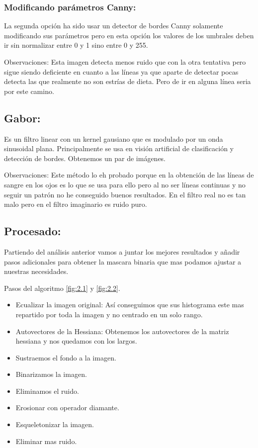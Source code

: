 \subsubsection{Modificando parámetros Canny:}

La segunda opción ha sido usar un detector de bordes Canny solamente modificando sus parámetros pero en esta opción los valores de los umbrales deben ir sin normalizar entre 0 y 1 sino entre 0 y 255.


Observaciones:
Esta imagen detecta menos ruido que con la otra tentativa pero sigue siendo deficiente en cuanto a las líneas ya que aparte de detectar pocas detecta las que realmente no son estrías de dieta. Pero de ir en alguna línea seria por este camino.



\subsection{Gabor:}

Es un filtro linear con un kernel gausiano  que es modulado por un onda sinusoidal plana. Principalmente se usa en visión artificial de clasificación y detección de bordes.
Obtenemos un par de imágenes.



Observaciones:
Este método lo eh probado porque en la obtención de las líneas de sangre en los ojos es lo que se usa para ello pero al no ser líneas continuas y no seguir un patrón no he conseguido buenos resultados. En el filtro real no es tan malo pero en el filtro imaginario es ruido puro.

\subsection{Procesado:}
Partiendo del análisis anterior vamos a juntar los mejores resultados y añadir pasos adicionales para obtener la mascara binaria que mas podamos ajustar a nuestras necesidades.


Pasos del algoritmo \ref{fig:2.1} y \ref{fig:2.2}.
\begin{itemize}
	\item Ecualizar la imagen original: Así conseguimos que sus histograma este mas repartido por toda la imagen y no centrado en un solo rango.
	\item Autovectores de la Hessiana: Obtenemos los autovectores de la matriz hessiana y nos quedamos con los largos. 
	\item Sustraemos el fondo a la imagen.
	\item Binarizamos la imagen.
	\item Eliminamos el ruido.
	\item Erosionar con operador diamante.
	\item Esqueletonizar la imagen.
	\item Eliminar mas ruido.
\end{itemize}


